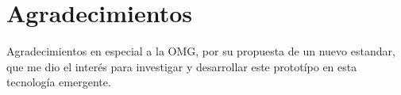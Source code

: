 \documentclass{melta}
\begin{document}
\balance

\section{Agradecimientos}
Agradecimientos en especial a la OMG, por su propuesta de un nuevo estandar, que me dio el interés para investigar y desarrollar este prototípo en esta tecnología emergente.

\newpage
\nocite{*} 




\end{document}
